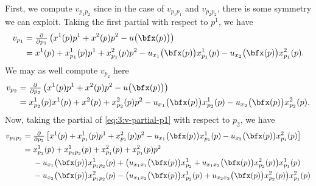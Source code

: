 \begin{solution}
  First, we compute \(v_{p_1p_2}\) since in the case of \(v_{p_1p_1}\) and
  \(v_{p_2p_2}\), there is some symmetry we can exploit. Taking the first
  partial with respect to \(p^1\), we have
  \begin{equation}
    \label{eq:3:v-partial-p1}
    \begin{aligned}
      v_{p_1} &=\tfrac{\partial}{\partial
        p_1}\left(x^1(p)p^1+x^2(p)p^2-u\bigl(\bfx(p)\bigr)\right)\\
      &=x^1(p)+x^1_{p_1}(p)p^1+x^2_{p_1}(p)p^2
      -u_{x_1}\bigl(\bfx(p)\bigr)x^1_{p_1}(p)-u_{x_2}\bigl(\bfx(p)\bigr)x^2_{p_1}(p).
    \end{aligned}
  \end{equation}
  We may as well compute \(v_{p_2}\) here
  \begin{equation}
    \label{eq:3:v-partial-p2}
    \begin{aligned}
      v_{p_2} &=\tfrac{\partial}{\partial
        p_2}\left(x^1(p)p^1+x^2(p)p^2-u\bigl(\bfx(p)\bigr)\right)\\
      &=x^1_{p_2}(p)x^1(p)+x^2(p)+x^2_{p_2}(p)p^2
      -u_{x_1}\bigl(\bfx(p)\bigr)x^1_{p_2}(p)
      -u_{x_2}\bigl(\bfx(p)\bigr)x^2_{p_2}(p).
    \end{aligned}
  \end{equation}
  Now, taking the partial of \eqref{eq:3:v-partial-p1} with respect to
  \(p_2\), we have
  \begin{equation}
    \label{eq:3:v-partial-p1p2}
    \begin{aligned}
      v_{p_1p_2}&=\tfrac{\partial}{\partial p_2} \left[
        x^1(p)+x^1_{p_1}(p)p^1+x^2_{p_1}(p)p^2
        -u_{x_1}\bigl(\bfx(p)\bigr)x^1_{p_1}(p)
        -u_{x_2}\bigl(\bfx(p)\bigr)x^2_{p_1}(p)
      \right]\\
      &=x^1_{p_2}(p)+x^1_{p_1p_2}(p)+x^2_{p_1}(p)+x^2_{p_1}(p)p^2\\
      &\phantom{{}={}}-u_{x_1}\bigl(\bfx(p)\bigr)x^1_{p_1p_2}(p)+
      \bigl(u_{x_1x_1}\bigl(\bfx(p)\bigr)x^1_{p_2}
      +u_{x_1x_2}\bigl(\bfx(p)\bigr)x^2_{p_2}(p)\bigr)x^1_{p_1}(p)\\
      &\phantom{{}={}}-u_{x_2}\bigl(\bfx(p)\bigr)x^2_{p_1p_2}(p)
      -\bigl(u_{x_1x_2}\bigl(\bfx(p)\bigr)x^1_{p_2}(p)
      +u_{x_2x_2}\bigl(\bfx(p)\bigr)x^2_{p_2}(p)\bigr)x^2_{p_1}(p)
    \end{aligned}
  \end{equation}


\end{solution}

